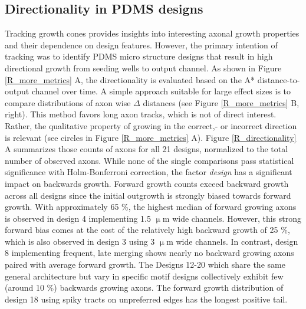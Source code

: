 \subsection{Directionality in PDMS designs}
Tracking growth cones provides insights into interesting axonal growth
properties and their dependence on design features. However, the primary
intention of tracking was to identify PDMS micro structure designs that result
in high directional growth from seeding wells to output channel. As shown in
Figure \ref{R_more_metrics} A, the directionality is evaluated based on the A*
distance-to-output channel over time. A simple approach suitable for large
effect sizes is to compare distributions of axon wise $\Delta$ distances (see
Figure \ref{R_more_metrics} B, right). This method favors long axon tracks,
which is not of direct interest. Rather, the qualitative property of growing in
the correct,- or incorrect direction is relevant (see circles in Figure
\ref{R_more_metrics} A).  Figure \ref{R_directionality} A summarizes those
counts of axons for all 21 designs, normalized to the total number of observed
axons. While none of the single comparisons pass statistical significance with
Holm-Bonferroni correction, the factor \textit{design} has a significant impact
on backwards growth. Forward growth counts exceed backward growth across all
designs since the initial outgrowth is strongly biased towards forward growth.
With approximately 65 \%, the highest median of forward growing axons is
observed in  design 4 implementing 1.5 $\upmu$m wide channels. However, this
strong forward bias comes at the cost of the relatively high backward growth of
25 \%, which is also observed in design 3 using 3 $\upmu$m wide channels. In
contrast, design 8 implementing frequent, late merging shows nearly no backward
growing axons paired with average forward growth. The Designs 12-20 which share
the same general architecture but vary in specific motif designs collectively
exhibit few (around 10 \%) backwards growing axons. The forward growth
distribution of design 18 using spiky tracts on unpreferred edges has the
longest positive tail. \\

